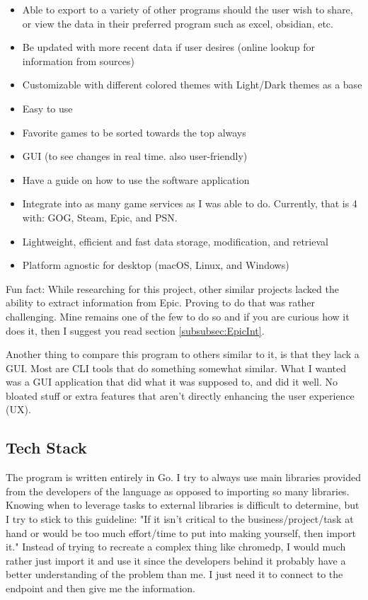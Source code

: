 \begin{itemize}
	\item Able to export to a variety of other programs should the user
		wish to share, or view the data in their preferred program such as
		excel, obsidian, etc.
	\item Be updated with more recent data if user desires (online
		lookup for information from sources)
	\item Customizable with different colored themes with Light/Dark
		themes as a base
	\item Easy to use
	\item Favorite games to be sorted towards the top always
	\item GUI (to see changes in real time. also user-friendly)
	\item Have a guide on how to use the software application
	\item Integrate into as many game services as I was able to do.
		Currently, that is 4 with: GOG, Steam, Epic, and PSN.
	\item Lightweight, efficient and fast data storage, modification, and retrieval
	\item Platform agnostic for desktop (macOS, Linux, and Windows)
\end{itemize}

Fun fact: While researching for this project, other similar
projects lacked the ability to extract information from Epic.
Proving to do that was rather challenging. Mine remains one of the
few to do so and if you are curious how it does it, then I suggest
you read section \ref{subsubsec:EpicInt}.

Another thing to compare this program to others similar to it, is
that they lack a GUI. Most are CLI tools that do something somewhat similar.
What I wanted was a GUI application that did what it was supposed to,
and did it well. No bloated stuff or extra features that aren't
directly enhancing the user experience (UX).

\subsection{Tech Stack}

The program is written entirely in Go. I try to always use main
libraries provided from the developers of the language as opposed to
importing so many libraries. Knowing when to leverage tasks to external
libraries is difficult to determine, but I try to stick to this guideline:
"If it isn't critical to the business/project/task at hand or would be
too much effort/time to put into making yourself, then import it."
Instead of trying to recreate a complex thing like chromedp, I would
much rather just import it and use it since the developers behind it
probably have a better understanding of the problem than me.
I just need it to connect to the endpoint and then give me the information.

